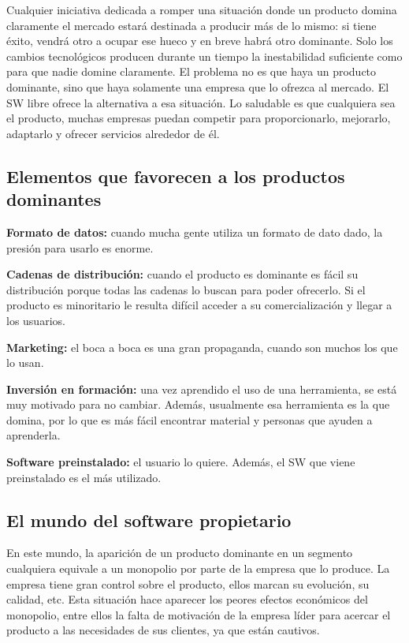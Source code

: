 Cualquier iniciativa dedicada a romper una situación donde un producto domina claramente el mercado estará destinada a producir más de lo mismo: si tiene éxito, vendrá otro a ocupar ese hueco y en breve habrá otro dominante. Solo los cambios tecnológicos producen durante un tiempo la inestabilidad suficiente como para que nadie domine claramente.
El problema no es que haya un producto dominante, sino que haya solamente una empresa que lo ofrezca al mercado. El SW libre ofrece la alternativa a esa situación.
Lo saludable es que cualquiera sea el producto, muchas empresas puedan competir para proporcionarlo, mejorarlo, adaptarlo y ofrecer servicios alrededor de él.

\subsection{Elementos que favorecen a los productos dominantes}

{\bf Formato de datos:  } cuando mucha gente utiliza un formato de dato dado, la presión para usarlo es enorme.

{\bf Cadenas de distribución: } cuando el producto es dominante es fácil su distribución porque todas las cadenas lo buscan para poder ofrecerlo. Si el producto es minoritario le resulta difícil acceder a su comercialización y llegar a los usuarios.

{\bf Marketing: } el boca a boca es una gran propaganda, cuando son muchos los que lo usan. 

{\bf Inversión en formación: } una vez aprendido el uso de una herramienta, se está muy motivado para no cambiar. Además, usualmente esa herramienta es la que domina, por lo que es más fácil encontrar material y personas que ayuden a aprenderla.

{\bf Software preinstalado: } el usuario lo quiere. Además, el SW que viene preinstalado es el más utilizado.

\subsection{El mundo del software propietario}

En este mundo, la aparición de un producto dominante en un segmento cualquiera equivale a un monopolio por parte de la empresa que lo produce.
La empresa tiene gran control sobre el producto, ellos marcan su evolución, su calidad, etc. 
Esta situación hace aparecer los peores efectos económicos del monopolio, entre ellos la falta de motivación de la empresa líder para acercar el producto a las necesidades de sus clientes, ya que están cautivos.

